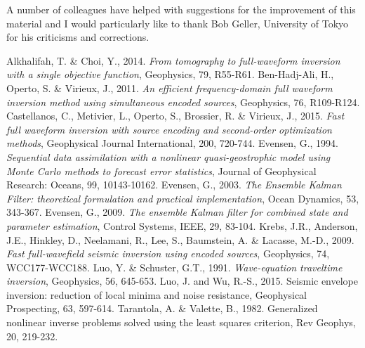\documentclass[mreferee]{gji}
\begin{document}
\begin{acknowledgments}
A number of colleagues have helped with suggestions for the
improvement of this material and I would particularly like to thank
Bob Geller, University of Tokyo for his criticisms and corrections.
\end{acknowledgments}

\begin{thebibliography}{}
   Alkhalifah, T. \& Choi, Y., 2014. \textit{From tomography to full-waveform inversion with a single objective function}, Geophysics, 79, R55-R61.
   Ben-Hadj-Ali, H., Operto, S. \& Virieux, J., 2011. \textit{An efficient frequency-domain full waveform inversion method using simultaneous encoded sources}, Geophysics, 76, R109-R124.
    Castellanos, C., Metivier, L., Operto, S., Brossier, R. \& Virieux, J., 2015. \textit{Fast full waveform inversion with source encoding and second-order optimization methods}, Geophysical Journal International, 200, 720-744. 
    Evensen, G., 1994. \textit{Sequential data assimilation with a nonlinear quasi-geostrophic model using Monte Carlo methods to forecast error statistics}, Journal of Geophysical Research: Oceans, 99, 10143-10162.
   Evensen, G., 2003. \textit{The Ensemble Kalman Filter: theoretical formulation and practical implementation}, Ocean Dynamics, 53, 343-367.
   Evensen, G., 2009. \textit{The ensemble Kalman filter for combined state and parameter estimation}, Control Systems, IEEE, 29, 83-104.
   Krebs, J.R., Anderson, J.E., Hinkley, D., Neelamani, R., Lee, S., Baumstein, A. \& Lacasse, M.-D., 2009. \textit{Fast full-wavefield seismic inversion using encoded sources}, Geophysics, 74, WCC177-WCC188.
   Luo, Y. \& Schuster, G.T., 1991. \textit{Wave-equation traveltime inversion}, Geophysics, 56, 645-653.
 Luo, J. and Wu, R.-S., 2015. Seismic envelope inversion: reduction of local minima and noise resistance, Geophysical Prospecting, 63, 597-614.
 Tarantola, A. \& Valette, B., 1982. Generalized nonlinear inverse problems solved using the least squares criterion, Rev Geophys, 20, 219-232.

\end{thebibliography}
\end{document}

